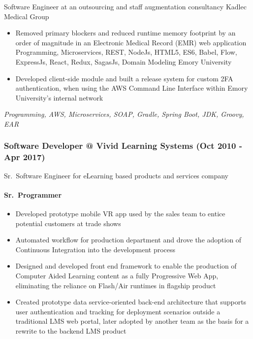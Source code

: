 Software Engineer at an outsourcing and staff augmentation consultancy
Kadlec Medical Group

\begin{itemize}
\tightlist
\item
  Removed primary blockers and reduced runtime memory footprint by an
  order of magnitude in an Electronic Medical Record (EMR) web
  application Programming, Microservices, REST, NodeJs, HTML5, ES6,
  Babel, Flow, ExpressJs, React, Redux, SagasJs, Domain Modeling Emory
  University
\item
  Developed client-side module and built a release system for custom 2FA
  authentication, when using the AWS Command Line Interface within Emory
  University's internal network
\end{itemize}

\emph{Programming, AWS, Microservices, SOAP, Gradle, Spring Boot, JDK,
Groovy, EAR}

\hypertarget{software-developer-vivid-learning-systems-oct-2010---apr-2017}{%
\subsubsection{Software Developer @ Vivid Learning Systems (Oct 2010 -
Apr
2017)}\label{software-developer-vivid-learning-systems-oct-2010---apr-2017}}

Sr.~Software Engineer for eLearning based products and services company

\hypertarget{sr.-programmer}{%
\paragraph{Sr.~Programmer}\label{sr.-programmer}}

\begin{itemize}
\tightlist
\item
  Developed prototype mobile VR app used by the sales team to entice
  potential customers at trade shows
\item
  Automated workflow for production department and drove the adoption of
  Continuous Integration into the development process
\item
  Designed and developed front end framework to enable the production of
  Computer Aided Learning content as a fully Progressive Web App,
  eliminating the reliance on Flash/Air runtimes in flagship product
\item
  Created prototype data service-oriented back-end architecture that
  supports user authentication and tracking for deployment scenarios
  outside a traditional LMS web portal, later adopted by another team as
  the basis for a rewrite to the backend LMS product
\end{itemize}

